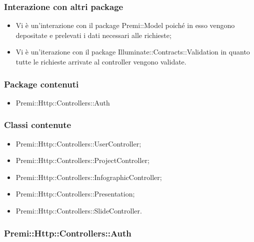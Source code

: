 	\subsubsection*{Interazione con altri package}
	\begin{itemize}
		\item Vi è un'interazione con il package Premi::Model poiché in esso vengono depositate e prelevati i dati necessari alle richieste;
		\item Vi è un'iterazione con il package Illuminate::Contracts::Validation in quanto tutte le richieste arrivate al controller vengono validate.
	\end{itemize}	

	\subsubsection*{Package contenuti}
		\begin{itemize}
			\item Premi::Http::Controllers::Auth
		\end{itemize}
	\subsubsection*{Classi contenute}
		\begin{itemize}
			\item Premi::Http::Controllers::UserController;
			\item Premi::Http::Controllers::ProjectController;
			\item Premi::Http::Controllers::InfographicController;
			\item Premi::Http::Controllers::Presentation;
			\item Premi::Http::Controllers::SlideController.
		\end{itemize}
		
	
	\subsubsection*{Premi::Http::Controllers::Auth}
